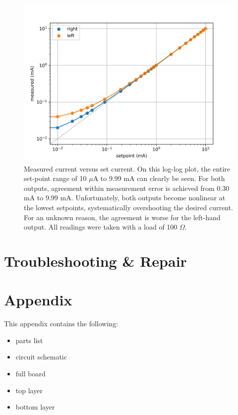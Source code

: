 \documentclass{manual}
\begin{document}
\clearpage
\begin{figure}
  \includegraphics[width=\linewidth]{../data/2018-11-13/setpoint}
  \caption{
    Measured current versus set current.
    On this log-log plot, the entire set-point range of 10 $\mu$A to 9.99 mA can clearly be seen.
    For both outputs, agreement within measurement error is achieved from 0.30 mA to 9.99 mA.
    Unfortunately, both outputs become nonlinear at the lowest setpoints, systematically overshooting the desired current.
    For an unknown reason, the agreement is worse for the left-hand output.
    All readings were taken with a load of 100 $\Omega$.
  }
  \label{fig:setpoint}
\end{figure}
\clearpage

\section{Troubleshooting \& Repair}

\section{Appendix}

This appendix contains the following:
\begin{itemize}
  \item parts list
  \item circuit schematic
  \item full board
  \item top layer
  \item bottom layer
\end{itemize}
\end{document}
